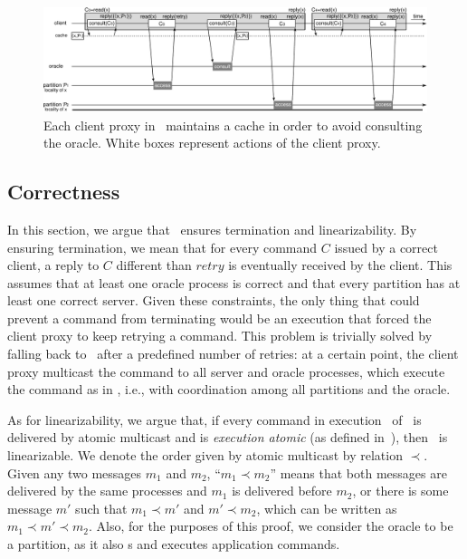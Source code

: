 
\begin{figure}
\begin{minipage}[b]{1\linewidth} %
\centering
      \includegraphics[width=1.0\linewidth]{figures/cache_retry}
\end{minipage}
\caption{Each client proxy in \dssmr\ maintains a cache in order to avoid  consulting the oracle. White boxes represent actions of the client proxy.}
\label{fig:cache_retry}
\end{figure}

\subsection{Correctness}
\label{sec:correctness}

In this section, we argue that \dssmr\ ensures termination and linearizability.
By ensuring termination, we mean that for every command $C$ issued by a correct client, a reply to $C$ different than $retry$ is eventually received by the client.
This assumes that at least one oracle process is correct and that every partition has at least one correct server.
Given these constraints, the only thing that could prevent a command from terminating would be an execution that forced the client proxy to keep retrying a command.
This problem is trivially solved by falling back to \ssmr\ after a predefined number of retries: at a certain point, the client proxy multicast the command to all server and oracle processes, which execute the command as in \ssmr{}, i.e., with coordination among all partitions and the oracle.

As for linearizability, we argue that, if every command in execution \ex\ of \dssmr\ is delivered by atomic multicast and is \emph{execution atomic} (as defined in~\cite{bezerra2014ssmr}), then \ex\ is linearizable.
We denote the order given by atomic multicast by relation $\prec$.
Given any two messages $m_1$ and $m_2$, ``$m_1 \prec m_2$'' means that both messages are delivered by the same processes and $m_1$ is delivered before $m_2$, or there is some message $m'$ such that $m_1 \prec m'$ and $m' \prec m_2$, which can be written as \mbox{$m_1 \prec m' \prec m_2$}.
Also, for the purposes of this proof, we consider the oracle to be a partition, as it also \amdel{}s and executes application commands.


